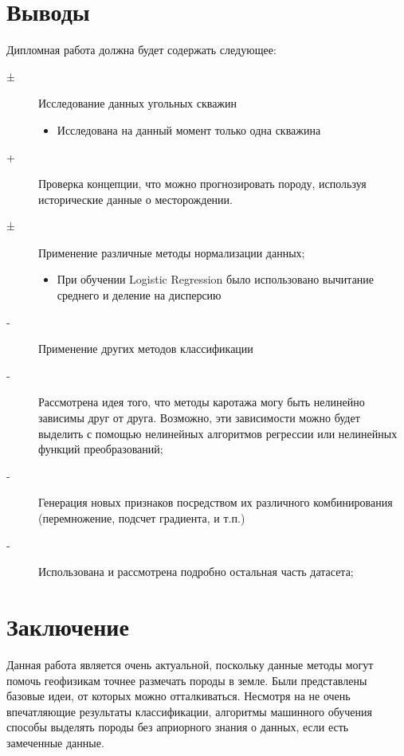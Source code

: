 \documentclass[aps,%
12pt,%
final,%
oneside,
onecolumn,%
musixtex, %
superscriptaddress,%
centertags]{article} %
\begin{document}
\section{Выводы}
Дипломная работа должна будет содержать следующее:
\begin{description}
  \item [±] Исследование данных угольных скважин
  \begin{itemize}
    \item Исследована на данный момент только одна скважина
  \end{itemize}
  \item [+] Проверка концепции, что можно прогнозировать породу, используя исторические данные о месторождении.
  \item [±] Применение различные методы нормализации данных;
  \begin{itemize}
    \item При обучении Logistic Regression было использовано вычитание среднего и деление на дисперсию
  \end{itemize}
  \item [-] Применение других методов классификации
  \item [-] Рассмотрена идея того, что методы каротажа могу быть нелинейно зависимы друг от друга. Возможно, эти зависимости можно будет выделить с помощью нелинейных алгоритмов регрессии или нелинейных функций преобразований;
  \item [-] Генерация новых признаков посредством их различного комбинирования (перемножение, подсчет градиента, и т.п.)
  \item [-] Использована и рассмотрена подробно остальная часть датасета;
\end{description}

\section{Заключение}
Данная работа является очень актуальной, поскольку данные методы могут помочь геофизикам точнее размечать породы в земле. Были представлены базовые идеи, от которых можно отталкиваться. Несмотря на не очень впечатляющие результаты классификации, алгоритмы машинного обучения способы выделять породы без априорного знания о данных, если есть замеченные данные.




\end{document}
